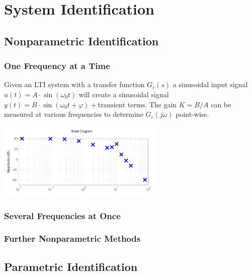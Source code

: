 \section{System Identification}

\subsection{Nonparametric Identification}

\subsubsection{One Frequency at a Time}
\begin{minipage}{10cm}
Given an LTI system with a transfer function $G_c(s)$ a sinusoidal 
input signal $u(t) = A \cdot \sin(\omega_0 t)$ will create a sinusoidal
signal $y(t) = B \cdot \sin(\omega_0 t + \varphi) + \text{transient terms}$.
The gain $K = B/A$ can be measured at various frequencies to determine
$G_c(j\omega)$ point-wise.
\end{minipage}
\hspace{0.5cm}
\begin{minipage}{8cm}
    \centering
    \includegraphics[width=8cm]{bilder/ident_bode.png}
\end{minipage}

\subsubsection{Several Frequencies at Once}

\subsubsection{Further Nonparametric Methods}

\subsection{Parametric Identification}

